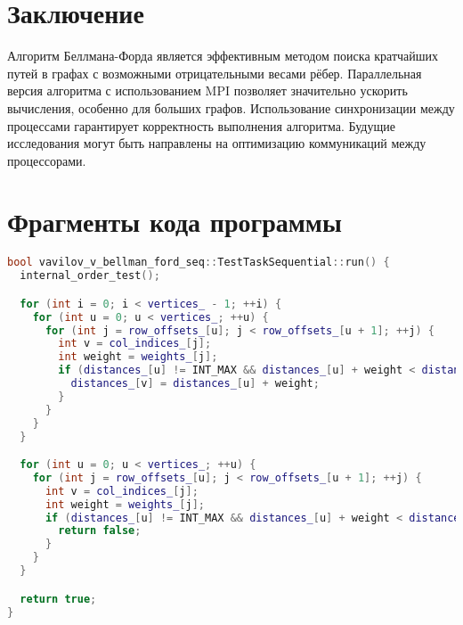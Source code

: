 \documentclass[12pt]{article}
\begin{document}
\section{Заключение}
Алгоритм Беллмана-Форда является эффективным методом поиска кратчайших путей в графах с возможными отрицательными весами рёбер. Параллельная версия алгоритма с использованием MPI позволяет значительно ускорить вычисления, особенно для больших графов. Использование синхронизации между процессами гарантирует корректность выполнения алгоритма. Будущие исследования могут быть направлены на оптимизацию коммуникаций между процессорами.

\section{Фрагменты кода программы}

\begin{lstlisting}[language=C++, caption={Последовательная реализация алгоритма Беллмана–Форда}]
bool vavilov_v_bellman_ford_seq::TestTaskSequential::run() {
  internal_order_test();

  for (int i = 0; i < vertices_ - 1; ++i) {
    for (int u = 0; u < vertices_; ++u) {
      for (int j = row_offsets_[u]; j < row_offsets_[u + 1]; ++j) {
        int v = col_indices_[j];
        int weight = weights_[j];
        if (distances_[u] != INT_MAX && distances_[u] + weight < distances_[v]) {
          distances_[v] = distances_[u] + weight;
        }
      }
    }
  }

  for (int u = 0; u < vertices_; ++u) {
    for (int j = row_offsets_[u]; j < row_offsets_[u + 1]; ++j) {
      int v = col_indices_[j];
      int weight = weights_[j];
      if (distances_[u] != INT_MAX && distances_[u] + weight < distances_[v]) {
        return false;
      }
    }
  }

  return true;
}

\end{lstlisting}
\end{document}
